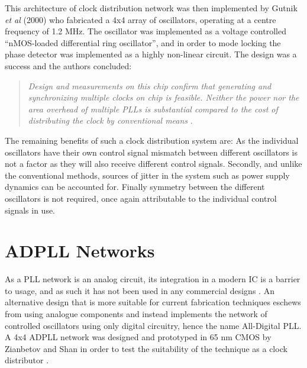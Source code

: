 This architecture of clock distribution network was then implemented by Gutnik \textit{et al} (2000) who fabricated a 4x4 array of oscillators, operating at a centre frequency of 1.2 MHz. The oscillator was implemented as a voltage controlled ``nMOS-loaded differential ring oscillator'', and in order to mode locking the phase detector was implemented as a highly non-linear circuit. The design was a success and the authors concluded:
\begin{quote}
	\textit{Design and measurements on this chip confirm that generating and synchronizing multiple clocks on chip is feasible. Neither the power nor the area overhead of multiple \acs{PLL}s is substantial compared to the cost of distributing the clock by conventional means} \cite{gutnik2000active}.
\end{quote}

The remaining benefits of such a clock distribution system are: As the individual oscillators have their own control signal mismatch between different oscillators is not a factor as they will also receive different control signals. Secondly, and unlike the conventional methods, sources of jitter in the system such as power supply dynamics can be accounted for. Finally symmetry between the different oscillators is not required, once again attributable to the individual control signals in use. 
\section{ADPLL Networks}
As a \ac{PLL} network is an analog circuit, its integration in a modern \ac{IC} is a barrier to usage, and as such it has not been used in any commercial designs \cite{zianbetov2013distributed}. An alternative design that is more suitable for current fabrication techniques eschews from using analogue components and instead implements the network of controlled oscillators using only digital circuitry, hence the name All-Digital \ac{PLL}. A 4x4 \ac{ADPLL} network was designed and prototyped in 65 nm CMOS by Zianbetov and Shan in order to test the suitability of the technique as a clock distributor \cite{zianbetov2013phd,shan2014phd}.

